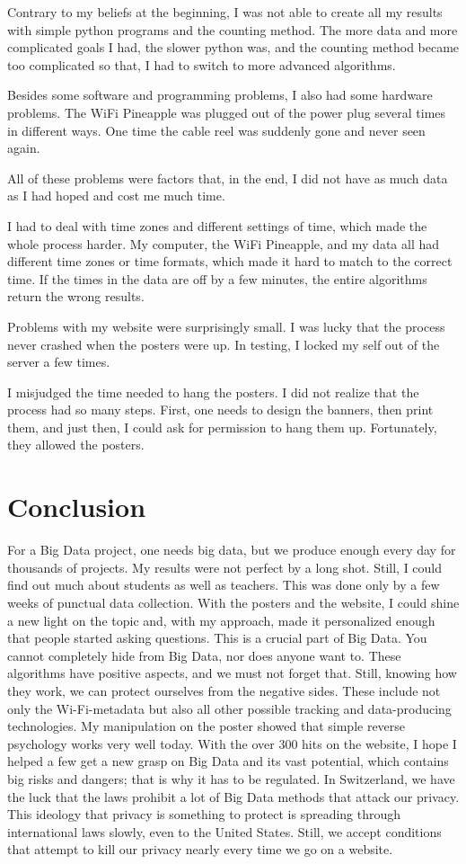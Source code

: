 \documentclass[paper=a4, fontsize=11pt]{article}
\begin{document}
Contrary to my beliefs at the beginning, I was not able to create all my results with simple python programs and the counting method. The more data and more complicated goals I had, the slower python was, and the counting method became too complicated so that, I had to switch to more advanced algorithms.

Besides some software and programming problems, I also had some hardware problems. The WiFi Pineapple was plugged out of the power plug several times in different ways. One time the cable reel was suddenly gone and never seen again.

All of these problems were factors that, in the end, I did not have as much data as I had hoped and cost me much time.

I had to deal with time zones and different settings of time, which made the whole process harder. My computer, the WiFi Pineapple, and my data all had different time zones or time formats, which made it hard to match to the correct time. If the times in the data are off by a few minutes, the entire algorithms return the wrong results.

Problems with my website were surprisingly small. I was lucky that the process never crashed when the posters were up. In testing, I locked my self out of the server a few times.

I misjudged the time needed to hang the posters. I did not realize that the process had so many steps. First, one needs to design the banners, then print them, and just then, I could ask for permission to hang them up. Fortunately, they allowed the posters.


\section{Conclusion}
For a Big Data project, one needs big data, but we produce enough every day for thousands of projects. My results were not perfect by a long shot. Still, I could find out much about students as well as teachers. This was done only by a few weeks of punctual data collection. With the posters and the website, I could shine a new light on the topic and, with my approach, made it personalized enough that people started asking questions. This is a crucial part of Big Data. You cannot completely hide from Big Data, nor does anyone want to. These algorithms have positive aspects, and we must not forget that. Still, knowing how they work, we can protect ourselves from the negative sides. These include not only the Wi-Fi-metadata but also all other possible tracking and data-producing technologies. My manipulation on the poster showed that simple reverse psychology works very well today. With the over 300 hits on the website, I hope I helped a few get a new grasp on Big Data and its vast potential, which contains big risks and dangers; that is why it has to be regulated.
In Switzerland, we have the luck that the laws prohibit a lot of Big Data methods that attack our privacy. This ideology that privacy is something to protect is spreading through international laws slowly, even to the United States. Still, we accept conditions that attempt to kill our privacy nearly every time we go on a website.
\end{document}

